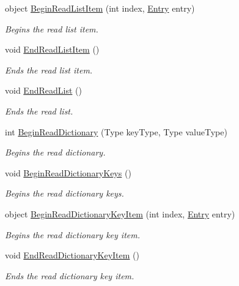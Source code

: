 \begin{DoxyCompactItemize}
object \hyperlink{interface_serialization_1_1_i_storage_abfe338de53a6322dbd3832d426ae49a4}{Begin\+Read\+List\+Item} (int index, \hyperlink{class_serialization_1_1_entry}{Entry} entry)
\begin{DoxyCompactList}\small\item\em Begins the read list item. \end{DoxyCompactList}\item 
void \hyperlink{interface_serialization_1_1_i_storage_a8308151ce64440db9ac2c385e3b96d45}{End\+Read\+List\+Item} ()
\begin{DoxyCompactList}\small\item\em Ends the read list item. \end{DoxyCompactList}\item 
void \hyperlink{interface_serialization_1_1_i_storage_a2349911c359017baa76773f203b33ee5}{End\+Read\+List} ()
\begin{DoxyCompactList}\small\item\em Ends the read list. \end{DoxyCompactList}\item 
int \hyperlink{interface_serialization_1_1_i_storage_a57c3bee701eba61b73c8ea69f29d3ca3}{Begin\+Read\+Dictionary} (Type key\+Type, Type value\+Type)
\begin{DoxyCompactList}\small\item\em Begins the read dictionary. \end{DoxyCompactList}\item 
void \hyperlink{interface_serialization_1_1_i_storage_ae44889714fb24b498bae004a9e6890ee}{Begin\+Read\+Dictionary\+Keys} ()
\begin{DoxyCompactList}\small\item\em Begins the read dictionary keys. \end{DoxyCompactList}\item 
object \hyperlink{interface_serialization_1_1_i_storage_a3739c13259528b0042e3e150357638a2}{Begin\+Read\+Dictionary\+Key\+Item} (int index, \hyperlink{class_serialization_1_1_entry}{Entry} entry)
\begin{DoxyCompactList}\small\item\em Begins the read dictionary key item. \end{DoxyCompactList}\item 
void \hyperlink{interface_serialization_1_1_i_storage_afdfcddaf43f8c474af85a0667541f785}{End\+Read\+Dictionary\+Key\+Item} ()
\begin{DoxyCompactList}\small\item\em Ends the read dictionary key item. \end{DoxyCompactList}\item 

\end{DoxyCompactItemize}
